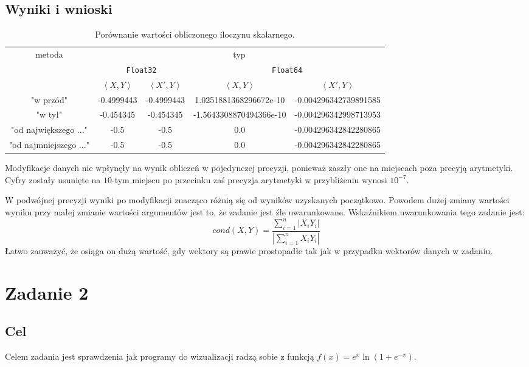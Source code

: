 \documentclass{article}
\begin{document}
\subsection{Wyniki i wnioski}
\begin{table}[h!]
    \centering
    \begin{tabular}{|c|c|c|c|c|}
    \hline 
    \multirow{3}{*}{metoda} & \multicolumn{4}{|c|}{typ} \\ 
    \cline{2-5}
    & \multicolumn{2}{|c|}{\texttt{Float32}} & \multicolumn{2}{|c|}{\texttt{Float64}}  \\ 
    \cline{2-5}
    & $\left< X, Y \right>$ & $\left< X', Y \right>$ & $\left< X, Y \right>$ & $\left< X', Y \right>$ \\
    \hline
    "w przód" & -0.4999443 & -0.4999443 & 1.0251881368296672e-10 & -0.004296342739891585 \\
    \hline 
    "w tył" & -0.454345 & -0.454345 & -1.5643308870494366e-10 & -0.004296342998713953 \\
    \hline 
    "od największego ..." & -0.5  & -0.5 & 0.0 & -0.004296342842280865 \\
    \hline 
    "od najmniejszego ..." & -0.5  & -0.5 & 0.0 & -0.004296342842280865 \\
    \hline
    \end{tabular}
    \caption{Porównanie wartości obliczonego iloczynu skalarnego.}
\end{table}

Modyfikacje danych nie wpłynęły na wynik obliczeń w pojedynczej precyzji, ponieważ zaszły one na miejscach poza precyją arytmetyki.
Cyfry zostały usunięte na $10$-tym miejscu po przecinku zaś precyzja arytmetyki w przybliżeniu wynosi $10^{-7}$.

W podwójnej precyzji wyniki po modyfikacji znacząco różnią się od wyników uzyskanych początkowo. Powodem dużej zmiany wartości wyniku przy małej zmianie wartości argumentów jest to, że zadanie jest źle uwarunkowane. Wskaźnikiem uwarunkowania tego zadanie jest:
$$
cond(X, Y) = \frac{\sum_{i=1}^{n} |X_iY_i|}{|\sum_{i=1}^{n} X_iY_i|}
$$
Łatwo zauważyć, że osiąga on dużą wartość, gdy wektory są prawie prostopadłe tak jak w przypadku wektorów danych w zadaniu.


\newpage

\section{Zadanie 2}
\subsection{Cel}
Celem zadania jest sprawdzenia jak programy do wizualizacji radzą sobie z funkcją $f(x)=e^x \ln (1+e^{-x})$.
\end{document}
